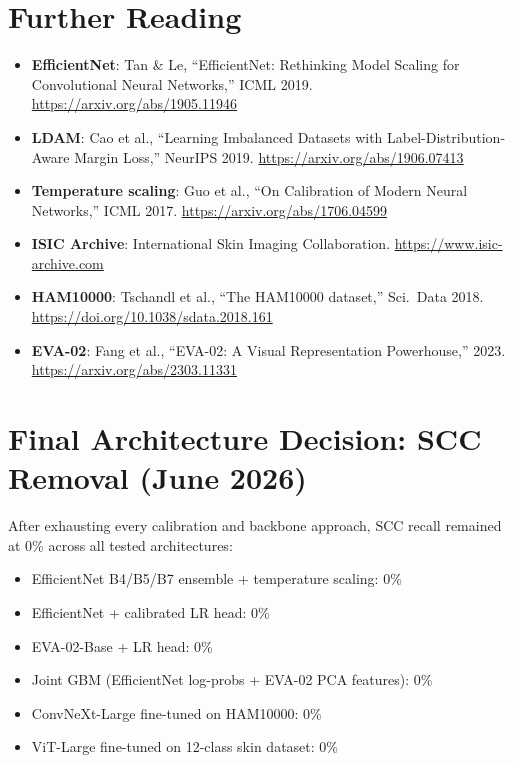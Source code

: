 \documentclass[12pt,a4paper]{article}
\begin{document}
\section{Further Reading}

\begin{itemize}
  \item \textbf{EfficientNet}: Tan \& Le, ``EfficientNet: Rethinking Model Scaling for
    Convolutional Neural Networks,'' ICML 2019. \url{https://arxiv.org/abs/1905.11946}
  \item \textbf{LDAM}: Cao et al., ``Learning Imbalanced Datasets with Label-Distribution-Aware
    Margin Loss,'' NeurIPS 2019. \url{https://arxiv.org/abs/1906.07413}
  \item \textbf{Temperature scaling}: Guo et al., ``On Calibration of Modern Neural Networks,''
    ICML 2017. \url{https://arxiv.org/abs/1706.04599}
  \item \textbf{ISIC Archive}: International Skin Imaging Collaboration.
    \url{https://www.isic-archive.com}
  \item \textbf{HAM10000}: Tschandl et al., ``The HAM10000 dataset,'' Sci.\ Data 2018.
    \url{https://doi.org/10.1038/sdata.2018.161}
  \item \textbf{EVA-02}: Fang et al., ``EVA-02: A Visual Representation Powerhouse,'' 2023.
    \url{https://arxiv.org/abs/2303.11331}
\end{itemize}

\section{Final Architecture Decision: SCC Removal (June 2026)}

After exhausting every calibration and backbone approach, SCC recall remained at 0\%
across all tested architectures:

\begin{itemize}
  \item EfficientNet B4/B5/B7 ensemble + temperature scaling: 0\%
  \item EfficientNet + calibrated LR head: 0\%
  \item EVA-02-Base + LR head: 0\%
  \item Joint GBM (EfficientNet log-probs + EVA-02 PCA features): 0\%
  \item ConvNeXt-Large fine-tuned on HAM10000: 0\%
  \item ViT-Large fine-tuned on 12-class skin dataset: 0\%
\end{itemize}
\end{document}
